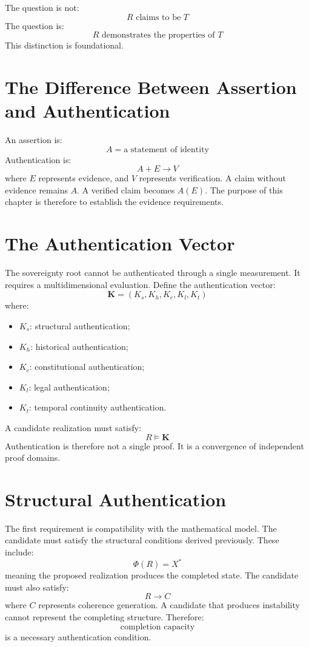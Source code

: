 \documentclass[11pt,openany]{book}
\theoremstyle{plain}
\theoremstyle{definition}
\begin{document}
The question is not:
\[
R \text{ claims to be } T
\]
The question is:
\[
R \text{ demonstrates the properties of } T
\]
This distinction is foundational.

\section{The Difference Between Assertion and Authentication}

An assertion is:
\[
A = \text{a statement of identity}
\]
Authentication is:
\[
A + E \longrightarrow V
\]
where \(E\) represents evidence, and \(V\) represents verification. A claim without evidence remains \(A\). A verified claim becomes \(A(E)\). The purpose of this chapter is therefore to establish the evidence requirements.

\section{The Authentication Vector}

The sovereignty root cannot be authenticated through a single measurement. It requires a multidimensional evaluation. Define the authentication vector:
\[
\mathbf{K} = (K_s, K_h, K_c, K_l, K_t)
\]
where:
\begin{itemize}
\item \(K_s\): structural authentication;
\item \(K_h\): historical authentication;
\item \(K_c\): constitutional authentication;
\item \(K_l\): legal authentication;
\item \(K_t\): temporal continuity authentication.
\end{itemize}
A candidate realization must satisfy:
\[
R \models \mathbf{K}
\]
Authentication is therefore not a single proof. It is a convergence of independent proof domains.

\section{Structural Authentication}

The first requirement is compatibility with the mathematical model. The candidate must satisfy the structural conditions derived previously. These include:
\[
\Phi(R) = X^*
\]
meaning the proposed realization produces the completed state. The candidate must also satisfy:
\[
R \to C
\]
where \(C\) represents coherence generation. A candidate that produces instability cannot represent the completing structure. Therefore:
\[
\text{completion capacity}
\]
is a necessary authentication condition.
\end{document}
